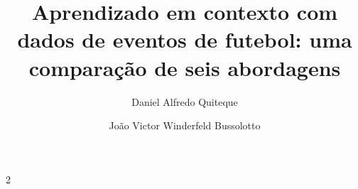 \documentclass[a4paper,12pt]{article}
\title{Aprendizado em contexto com dados de eventos de futebol: uma comparação de seis abordagens} %
\author[1]{Daniel Alfredo Quiteque}
\author[1]{João Victor Winderfeld Bussolotto}
\affil[1]{Pós-graduação em Inteligência Artificial Aplicada, UniSENAI}
\date{}
\begin{document}
\maketitle

\begin{multicols*}{2}
\raggedcolumns %













\end{multicols*}
\end{document}
